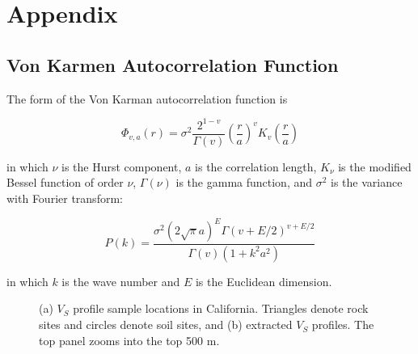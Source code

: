 
\appendix
\linespread{1.7}
\chapter*{Appendix}
\linespread{2.0}
\renewcommand{\thesection}{A}
\renewcommand{\thesubsection}{A\arabic{subsection}}
\renewcommand{\thefigure}{A\arabic{figure}}
\renewcommand{\theequation}{A\arabic{equation}}
\renewcommand{\thetable}{A\arabic{table}}


\linespread{1.7}
\section{Von Karmen Autocorrelation Function}
\linespread{2.0}
\label{app:A}

The form of the Von Karman autocorrelation function \citep{frankelFiniteDifferenceSimulations1986} is

\begin{equation}\label{eq:app-A1}
    \Phi_{v, a}(r)=\sigma^{2} \frac{2^{1-v}}{\Gamma(v)}\left(\frac{r}{a}\right)^{v} K_{v}\left(\frac{r}{a}\right)
\end{equation}

\noindent in which $\nu$ is the Hurst component, $a$ is the correlation length, $K_{\nu}$ is the modified Bessel function of order $\nu$, $\Gamma(\nu)$ is the gamma function, and $\sigma^2$ is the variance with Fourier transform:

\begin{equation}\label{eq:app-A2}
    P(k)=\frac{\sigma^{2}(2 \sqrt{\pi} a)^{E} \Gamma(v+E / 2)^{v+E / 2}}{\Gamma(v)\left(1+k^{2} a^{2}\right)}
\end{equation}

\noindent in which $k$ is the wave number and $E$ is the Euclidean dimension.

\clearpage
{}
\begin{figure}[!ht]
     \hfil
    \caption{ (a) $V_S$ profile sample locations in California. Triangles denote rock sites and circles denote soil sites, and (b) extracted $V_S$ profiles. The top panel zooms into the top 500 m. }
\end{figure}






